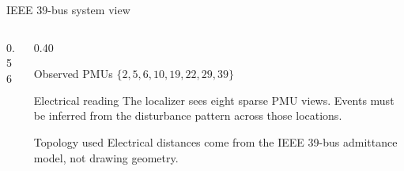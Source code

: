 ﻿\documentclass[10pt,aspectratio=169]{beamer}
\begin{document}
\begin{frame}{IEEE 39-bus system view}
\begin{columns}[T,totalwidth=\textwidth]
\begin{column}{0.56\textwidth}
{
}
\end{column}
\begin{column}{0.40\textwidth}
\scriptsize
\begin{block}{Observed PMUs}
\centering $\{2,5,6,10,19,22,29,39\}$
\end{block}
\begin{exampleblock}{Electrical reading}
The localizer sees eight sparse PMU views. Events must be inferred from the disturbance pattern across those locations.
\end{exampleblock}
\begin{alertblock}{Topology used}
Electrical distances come from the IEEE 39-bus admittance model, not drawing geometry.
\end{alertblock}
\end{column}
\end{columns}
\end{frame}
\end{document}
